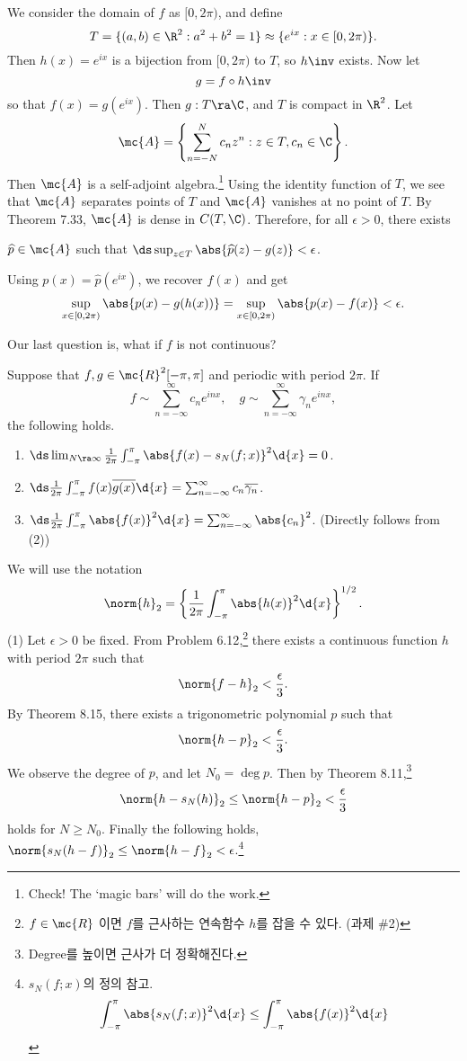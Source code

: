 \pf We consider the domain of \(f\) as \([0, 2\pi)\), and define
\[
    T = \{(a, b) \in \R^2 : a^2 + b^2 = 1\} \approx \{e^{ix} : x \in [0, 2\pi)\}.
\]
Then \(h(x) = e^{ix}\) is a bijection from \([0, 2\pi)\) to \(T\), so \(h\inv\) exists. Now let
\[
    g = f\circ h\inv
\]
so that \(f(x) = g(e^{ix})\). Then \(g : T \ra \C\), and \(T\) is compact in \(\R^2\). Let
\[
    \mc{A} = \left\{ \sum_{n=-N}^N c_n z^n : z\in T, c_n\in \C \right\}.
\]
Then \(\mc{A}\) is a self-adjoint algebra.\footnote{Check! The `magic bars' will do the work.} Using the identity function of \(T\), we see that \(\mc{A}\) separates points of \(T\) and \(\mc{A}\) vanishes at no point of \(T\). By {\sffamily Theorem 7.33}, \(\mc{A}\) is dense in \(C(T, \C)\). Therefore, for all \(\epsilon > 0\), there exists
\begin{center}
    \(\widehat{p} \in \mc{A}\) such that \(\ds \sup_{z \in T} \abs{\widehat{p}(z) - g(z)} < \epsilon\).
\end{center}
Using \(p(x) = \widehat{p}(e^{ix})\), we recover \(f(x)\) and get
\[
    \sup_{x \in [0, 2\pi)} \abs{p(x) - g(h(x))} = \sup_{x \in [0, 2\pi)} \abs{p(x) - f(x)} < \epsilon.
\]

\medskip

Our last question is, what if \(f\) is not continuous?

  Suppose that \(f, g \in \mc{R}^{2}[-\pi, \pi]\) and periodic with period \(2\pi\). If
\[
    f \sim \sum_{n=-\infty}^\infty c_n e^{inx}, \quad g \sim \sum_{n=-\infty}^\infty \gamma_n e^{inx},
\]
the following holds.
\begin{enumerate}
    \item \(\ds \lim_{N \ra \infty} \frac{1}{2\pi} \int_{-\pi}^\pi \abs{f(x) - s_N(f; x)}^2 \d{x} = 0\).
    \item {} \(\ds \frac{1}{2\pi} \int_{-\pi}^\pi f(x) \overline{g(x)} \d{x} = \sum_{n = -\infty}^\infty c_n \overline{\gamma_n}\).
    \item \(\ds \frac{1}{2\pi} \int_{-\pi}^\pi \abs{f(x)}^2 \d{x} = \sum_{n = -\infty}^\infty \abs{c_n}^2\). (Directly follows from (2))
\end{enumerate}

\pf We will use the notation
\[
    \norm{h}_2 = \left\{\frac{1}{2\pi} \int_{-\pi}^\pi \abs{h(x)}^2 \d{x}\right\}^{1/2}.
\]
(1) Let \(\epsilon > 0\) be fixed. From {\sffamily Problem 6.12},\footnote{\(f \in \mc{R}\) 이면 \(f\)를 근사하는 연속함수 \(h\)를 잡을 수 있다. (과제 \#2)} there exists a continuous function \(h\) with period \(2\pi\) such that
\[
    \norm{f - h}_2 < \frac{\epsilon}{3}.
\]
By {\sffamily Theorem 8.15}, there exists a trigonometric polynomial \(p\) such that
\[
    \norm{h - p}_2 < \frac{\epsilon}{3}.
\]
We observe the degree of \(p\), and let \(N_0 = \deg p\). Then by {\sffamily Theorem 8.11},\footnote{Degree를 높이면 근사가 더 정확해진다.}
\[
    \norm{h - s_N(h)}_2 \leq \norm{h - p}_2 < \frac{\epsilon}{3}
\]
holds for \(N \geq N_0\). Finally the following holds, \(\norm{s_N(h-f)}_2 \leq \norm{h - f}_2 < \epsilon\).\footnote{\(s_N(f;x)\)의 정의 참고. \[\int_{-\pi}^\pi \abs{s_N(f;x)}^2 \d{x} \leq \int_{-\pi}^\pi \abs{f(x)}^2 \d{x}\]}

